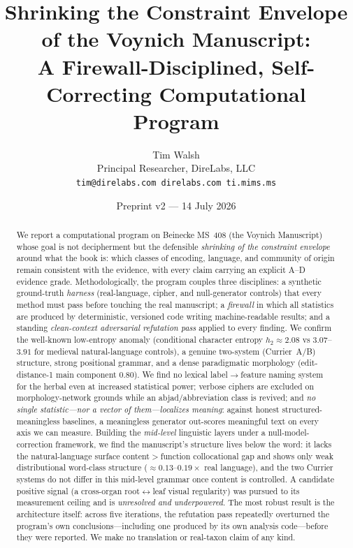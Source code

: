 \documentclass[11pt]{article}
\title{\textbf{Shrinking the Constraint Envelope of the Voynich Manuscript:\\
A Firewall-Disciplined, Self-Correcting Computational Program}}
\author{Tim Walsh \\ \small Principal Researcher, DireLabs, LLC \\
\small \texttt{tim@direlabs.com \quad direlabs.com \quad ti.mims.ms}}
\date{Preprint v2 --- 14 July 2026}
\begin{document}
\maketitle

\begin{abstract}
\noindent We report a computational program on Beinecke MS~408 (the Voynich
Manuscript) whose goal is not decipherment but the defensible \emph{shrinking of the
constraint envelope} around what the book is: which classes of encoding, language,
and community of origin remain consistent with the evidence, with every claim carrying
an explicit A--D evidence grade. Methodologically, the program couples three
disciplines: a synthetic ground-truth \emph{harness} (real-language, cipher, and
null-generator controls) that every method must pass before touching the real
manuscript; a \emph{firewall} in which all statistics are produced by deterministic,
versioned code writing machine-readable results; and a standing \emph{clean-context
adversarial refutation pass} applied to every finding. We confirm the well-known
low-entropy anomaly (conditional character entropy $h_2\approx 2.08$ vs
$3.07$--$3.91$ for medieval natural-language controls), a genuine two-system
(Currier~A/B) structure, strong positional grammar, and a dense paradigmatic
morphology (edit-distance-1 main component $0.80$). We find no lexical
label$\rightarrow$feature naming system for the herbal even at increased statistical
power; verbose ciphers are excluded on morphology-network grounds while an
abjad/abbreviation class is revived; and \emph{no single statistic---nor a vector of
them---localizes meaning}: against honest structured-meaningless baselines, a
meaningless generator out-scores meaningful text on every axis we can measure. Building
the \emph{mid-level} linguistic layers under a null-model-correction framework, we find
the manuscript's structure lives below the word: it lacks the natural-language surface
content$>$function collocational gap and shows only weak distributional word-class
structure ($\approx\!0.13$--$0.19\times$ real language), and the two Currier systems do
not differ in this mid-level grammar once content is controlled. A candidate positive
signal (a cross-organ root$\leftrightarrow$leaf visual regularity) was pursued to its
measurement ceiling and is \emph{unresolved and underpowered}. The most robust result
is the architecture itself: across five iterations, the refutation pass repeatedly
overturned the program's own conclusions---including one produced by its own analysis
code---before they were reported. We make no translation or real-taxon claim of any
kind.
\end{abstract}
\end{document}
